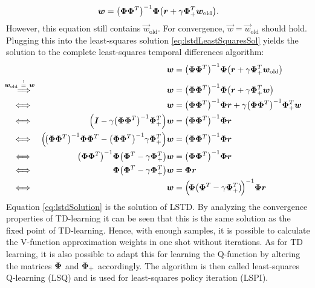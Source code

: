 			\begin{equation}
				\bm{w} = \big( \bm{\Phi} \bm{\Phi}^T \big)^{-1} \bm{\Phi} \big( \bm{r} + \gamma \bm{\Phi}_+^T \bm{w}_\mathrm{old} \big).  \label{eq:lstdLeastSquaresSol}
			\end{equation}
			However, this equation still contains \( \vec{w}_\mathrm{old} \). For convergence, \( \vec{w} = \vec{w}_\mathrm{old} \) should hold. Plugging this into the least-squares solution \eqref{eq:lstdLeastSquaresSol} yields the solution to the complete least-squares temporal differences algorithm:
			\begin{align}
				&&
				\vec{w} &= \big( \mat{\Phi} \mat{\Phi}^T \big)^{-1} \mat{\Phi} \big( \vec{r} + \gamma \mat{\Phi}_+^T \vec{w}_\mathrm{old} \big) &  \nonumber \\
				\overset{\mathclap{\raisebox{1pt}{\scriptsize \( \vec{w}_\mathrm{old} \,\overset{!}{=}\, \vec{w} \)}}}{\quad\implies} &&
				\vec{w} &= \big( \mat{\Phi} \mat{\Phi}^T \big)^{-1} \mat{\Phi} \big( \vec{r} + \gamma \mat{\Phi}_+^T \vec{w} \big) &  \nonumber \\
				\iff &&
				\vec{w} &= \big( \mat{\Phi} \mat{\Phi}^T \big)^{-1} \mat{\Phi} \vec{r} + \gamma \big( \mat{\Phi} \mat{\Phi}^T \big)^{-1} \mat{\Phi}_+^T \vec{w} &  \nonumber \\
				\iff &&
				\Big( \mat{I} - \gamma \big( \mat{\Phi} \mat{\Phi}^T \big)^{-1} \mat{\Phi}_+^T \Big) \vec{w} &= \big( \mat{\Phi} \mat{\Phi}^T \big)^{-1} \mat{\Phi} \vec{r} &  \nonumber \\
				\iff &&
				\Big(\! \big( \mat{\Phi} \mat{\Phi}^T \big)^{-1} \mat{\Phi} \mat{\Phi}^T - \big( \mat{\Phi} \mat{\Phi}^T \big)^{-1} \gamma \mat{\Phi}_+^T \Big) \vec{w} &= \big( \mat{\Phi} \mat{\Phi}^T \big)^{-1} \mat{\Phi} \vec{r} &  \nonumber \\
				\iff &&
				\big( \mat{\Phi} \mat{\Phi}^T \big)^{-1} \mat{\Phi} \big( \mat{\Phi}^T - \gamma \mat{\Phi}_+^T \big) \vec{w} &= \big( \mat{\Phi} \mat{\Phi}^T \big)^{-1} \mat{\Phi} \vec{r} &  \nonumber \\
				\iff &&
				\mat{\Phi} \big( \mat{\Phi}^T - \gamma \mat{\Phi}_+^T \big) \vec{w} &= \mat{\Phi} \vec{r} &  \nonumber \\
				\iff &&
				\vec{w} &= \Big(\! \mat{\Phi} \big( \mat{\Phi}^T - \gamma \mat{\Phi}_+^T \big) \!\Big)^{-1} \mat{\Phi} \vec{r} &  \label{eq:lstdSolution}
			\end{align}
			Equation \eqref{eq:lstdSolution} is the solution of LSTD. By analyzing the convergence properties of TD-learning it can be seen that this is the same solution as the fixed point of TD-learning. Hence, with enough samples, it is possible to calculate the V-function approximation weights in one shot without iterations. As for TD learning, it is also possible to adapt this for learning the Q-function by altering the matrices \( \bm{\Phi} \) and \( \bm{\Phi}_+ \) accordingly. The algorithm is then called least-squares Q-learning (LSQ) and is used for least-squares policy iteration (LSPI).

